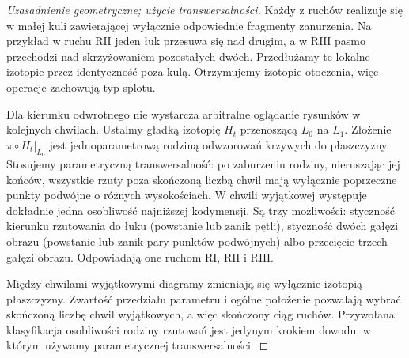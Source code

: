 \documentclass[11pt,a4paper]{report}
\numberwithin{equation}{section}
\theoremstyle{plain}
\theoremstyle{definition}
\theoremstyle{remark}
\begin{document}
\begin{proof}[Uzasadnienie geometryczne; użycie transwersalności]
Każdy z ruchów realizuje się w małej kuli zawierającej wyłącznie
odpowiednie fragmenty zanurzenia. Na przykład w ruchu $\mathrm{R II}$
jeden łuk przesuwa się nad drugim, a w $\mathrm{R III}$ pasmo
przechodzi nad skrzyżowaniem pozostałych dwóch. Przedłużamy
te lokalne izotopie przez identyczność poza kulą. Otrzymujemy
izotopie otoczenia, więc operacje zachowują typ splotu.

Dla kierunku odwrotnego nie wystarcza arbitralne oglądanie
rysunków w kolejnych chwilach. Ustalmy gładką izotopię
$H_t$ przenoszącą $L_0$ na $L_1$. Złożenie
$\pi\circ H_t|_{L_0}$ jest jednoparametrową rodziną
odwzorowań krzywych do płaszczyzny. Stosujemy parametryczną
transwersalność: po zaburzeniu rodziny, nieruszając jej
końców, wszystkie rzuty poza skończoną liczbą chwil mają
wyłącznie poprzeczne punkty podwójne o różnych wysokościach.
W chwili wyjątkowej występuje dokładnie jedna osobliwość
najniższej kodymensji. Są trzy możliwości: styczność kierunku
rzutowania do łuku (powstanie lub zanik pętli), styczność
dwóch gałęzi obrazu (powstanie lub zanik pary punktów
podwójnych) albo przecięcie trzech gałęzi obrazu. Odpowiadają
one ruchom $\mathrm{R I}$, $\mathrm{R II}$ i $\mathrm{R III}$.

Między chwilami wyjątkowymi diagramy zmieniają się wyłącznie
izotopią płaszczyzny. Zwartość przedziału parametru i ogólne
położenie pozwalają wybrać skończoną liczbę chwil wyjątkowych,
a więc skończony ciąg ruchów. Przywołana klasyfikacja
osobliwości rodziny rzutowań jest jedynym krokiem dowodu,
w którym używamy parametrycznej transwersalności.
\end{proof}


\begin{center}
\end{center}
\end{document}
